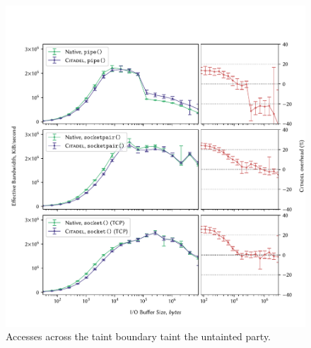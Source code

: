 \begin{figure}[]
    \centering
    \includegraphics[width=\linewidth]{figures/graphs/ipc-2proc.pdf}
    \caption[Accesses across the taint boundary]{Accesses across the taint boundary taint the untainted party.}
    \label{fig:ipc-2proc-graph}
\end{figure}